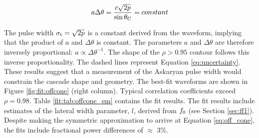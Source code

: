 \documentclass[amsmath,amssymb,aps,prd,10pt,twocolumn]{revtex4}
\begin{document}
\begin{equation}
a \Delta\theta = \frac{c\sqrt{2p}}{\sin\theta_{\rm C}} = constant \label{eq:uncertainty}
\end{equation}

The pulse width $\sigma_{\rm t} = \sqrt{2 p}$ is a constant derived from the waveform, implying that the product of $a$ and $\Delta \theta$ is constant.  The parameters $a$ and $\Delta\theta$ are therefore inversely proportional: $a \propto \Delta\theta^{-1}$.  The shape of the $\rho>0.95$ contour follows this inverse proportionality.  The dashed lines represent Equation \ref{eq:uncertainty}.  These results suggest that a measurement of the Askaryan pulse width would constrain the cascade shape and geometry.  The best-fit waveforms are shown in Figure \ref{fig:fit:offcone} (right column).  Typical correlation coefficients exceed $\rho = 0.98$.  Table \ref{fit:tab:offcone_em} contains the fit results.  The fit results include estimates of the lateral width parameter, $l$, derived from $f_{\rm 0}$ (see Section \ref{sec:ff1}).  Despite making the symmetric approximation to arrive at Equation \ref{eq:off_cone}, the fits include fractional power differences of $\approx$ 3\%.
\end{document}
